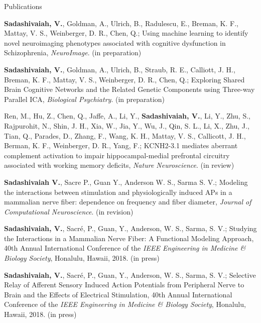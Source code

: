 \documentclass{resume}
\begin{document}
\vspace{1em} 

\begin{rSection}{Publications}
\begin{publications}
\item \textbf{Sadashivaiah, V.}, Goldman, A., Ulrich, B., Radulescu, E., Breman, K. F., Mattay, V. S., Weinberger, D. R., Chen, Q.; Using machine learning to identify novel neuroimaging phenotypes associated with cognitive dysfunction in Schizophrenia, \textit{NeuroImage}. (in preparation)
 
\item \textbf{Sadashivaiah, V.}, Goldman, A., Ulrich, B., Straub, R. E., Calliott, J. H., Breman, K. F., Mattay, V. S., Weinberger, D. R., Chen, Q.; Exploring Shared Brain Cognitive Networks and the Related Genetic Components using Three-way Parallel ICA, \textit{Biological Psychiatry}. (in preparation) 

\item Ren, M., Hu, Z., Chen, Q., Jaffe, A., Li, Y., \textbf{Sadashivaiah, V.}, Li, Y., Zhu, S., Rajpurohit, N., Shin, J. H., Xia, W., Jia, Y., Wu, J., Qin, S. L., Li, X., Zhu, J., Tian, Q., Parades, D., Zhang, F., Wang, K. H., Mattay, V. S., Callicott, J. H., Berman, K. F., Weinberger, D. R., Yang, F.; KCNH2-3.1 mediates aberrant complement activation to impair hippocampal-medial prefrontal circuitry associated with working memory deficits, \textit{Nature Neuroscience}. (in review)

\item \textbf{Sadashivaiah V.}, Sacre P., Guan Y., Anderson W. S., Sarma S. V.; Modeling the interactions between stimulation and physiologically induced APs in a mammalian nerve fiber: dependence on frequency and fiber diameter, \textit{Journal of Computational Neuroscience}. (in revision)

\item \textbf{Sadashivaiah, V.}, Sacré, P., Guan, Y., Anderson, W. S., Sarma, S. V.; Studying the Interactions in a Mammalian Nerve Fiber: A Functional Modeling Approach, 40th Annual International Conference of the \textit{IEEE Engineering in Medicine \& Biology Society}, Honalulu, Hawaii, 2018. (in press)

\item \textbf{Sadashivaiah, V.}, Sacré, P., Guan, Y., Anderson, W. S., Sarma, S. V.; Selective Relay of Afferent Sensory Induced Action Potentials from Peripheral Nerve to Brain and the Effects of Electrical Stimulation, 40th Annual International Conference of the \textit{IEEE Engineering in Medicine \& Biology Society}, Honalulu, Hawaii, 2018. (in press)


\end{publications}
\end{rSection}
\end{document}
